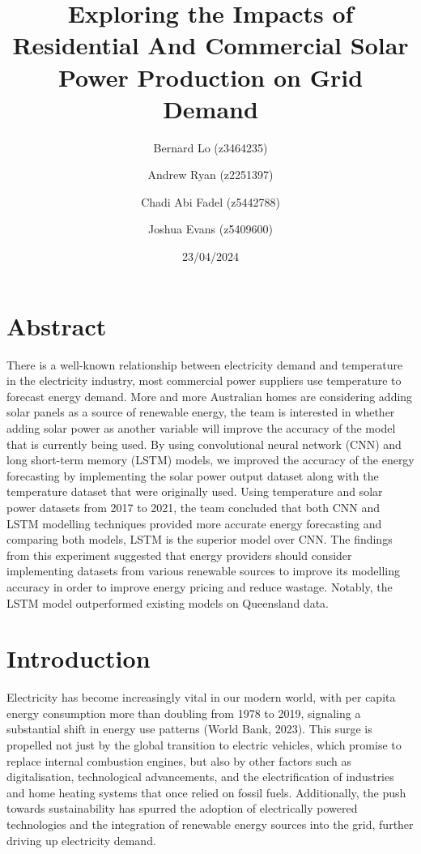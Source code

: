 \documentclass[
]{article}
\title{Exploring the Impacts of Residential And Commercial Solar Power
Production on Grid Demand}
\author{Bernard Lo (z3464235) \and Andrew Ryan (z2251397) \and Chadi Abi
Fadel (z5442788) \and Joshua Evans (z5409600)}
\date{23/04/2024}
\begin{document}
\maketitle

{
\setcounter{tocdepth}{2}
\tableofcontents
}
\section{Abstract}\label{abstract}

There is a well-known relationship between electricity demand and
temperature in the electricity industry, most commercial power suppliers
use temperature to forecast energy demand. More and more Australian
homes are considering adding solar panels as a source of renewable
energy, the team is interested in whether adding solar power as another
variable will improve the accuracy of the model that is currently being
used. By using convolutional neural network (CNN) and long short-term
memory (LSTM) models, we improved the accuracy of the energy forecasting
by implementing the solar power output dataset along with the
temperature dataset that were originally used. Using temperature and
solar power datasets from 2017 to 2021, the team concluded that both CNN
and LSTM modelling techniques provided more accurate energy forecasting
and comparing both models, LSTM is the superior model over CNN. The
findings from this experiment suggested that energy providers should
consider implementing datasets from various renewable sources to improve
its modelling accuracy in order to improve energy pricing and reduce
wastage. Notably, the LSTM model outperformed existing models on
Queensland data.

\section{Introduction}\label{introduction}

Electricity has become increasingly vital in our modern world, with per
capita energy consumption more than doubling from 1978 to 2019,
signaling a substantial shift in energy use patterns (World Bank, 2023).
This surge is propelled not just by the global transition to electric
vehicles, which promise to replace internal combustion engines, but also
by other factors such as digitalisation, technological advancements, and
the electrification of industries and home heating systems that once
relied on fossil fuels. Additionally, the push towards sustainability
has spurred the adoption of electrically powered technologies and the
integration of renewable energy sources into the grid, further driving
up electricity demand.
\end{document}
